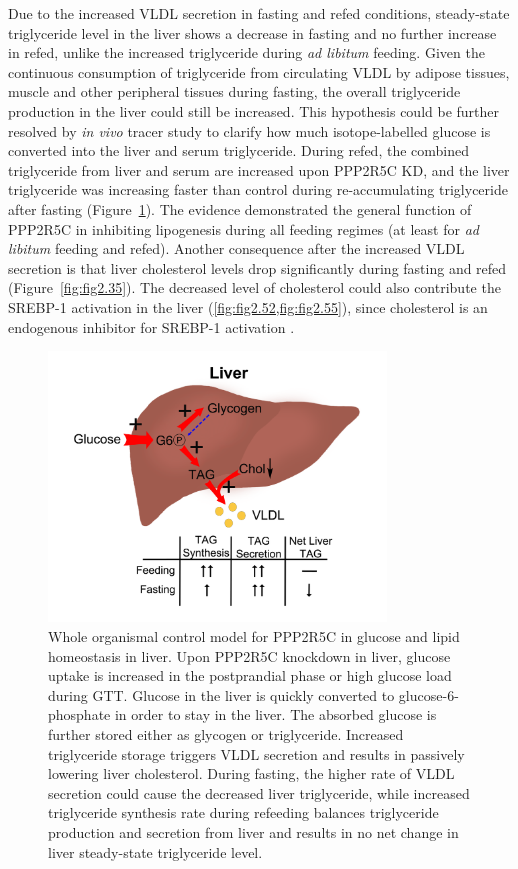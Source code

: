 Due to the increased VLDL secretion in fasting and refed conditions, steady-state triglyceride level in the liver shows a decrease in fasting and no further increase in refed, unlike the increased triglyceride during \textit{ad libitum} feeding. Given the continuous consumption of triglyceride from circulating VLDL by adipose tissues, muscle and other peripheral tissues during fasting, the overall triglyceride production in the liver could still be increased. This hypothesis could be further resolved by \textit{in vivo} tracer study to clarify how much isotope-labelled glucose is converted into the liver and serum triglyceride. During refed, the combined triglyceride from liver and serum are increased upon PPP2R5C KD, and the liver triglyceride was increasing faster than control during re-accumulating triglyceride after fasting (Figure~\ref{fig:fig2.56}). The evidence demonstrated the general function of PPP2R5C in inhibiting lipogenesis during all feeding regimes (at least for \textit{ad libitum} feeding and refed). Another consequence after the increased VLDL secretion is that liver cholesterol levels drop significantly during fasting and refed (Figure~\ref{fig:fig2.35}). The decreased level of cholesterol could also contribute the SREBP-1 activation in the liver (\cref{fig:fig2.52,fig:fig2.55}), since cholesterol is an endogenous inhibitor for SREBP-1 activation \cite{wang_srebp-1_1994}. 


\begin{figure}[!tb]
\centering
\includegraphics[width=0.8\textwidth]{figs/fig2-56 whole organismal model.png}
\caption[Whole organismal model for PPP2R5C's metabolic control]{\footnotesize Whole organismal control model for PPP2R5C in glucose and lipid homeostasis in liver. Upon PPP2R5C knockdown in liver, glucose uptake is increased in the postprandial phase or high glucose load during GTT. Glucose in the liver is quickly converted to glucose-6-phosphate in order to stay in the liver. The absorbed glucose is further stored either as glycogen or triglyceride. Increased triglyceride storage triggers VLDL secretion and results in passively lowering liver cholesterol. During fasting, the higher rate of VLDL secretion could cause the decreased liver triglyceride, while increased triglyceride synthesis rate during refeeding balances triglyceride production and secretion from liver and results in no net change in liver steady-state triglyceride level.}
\label{fig:fig2.56}
\end{figure}

